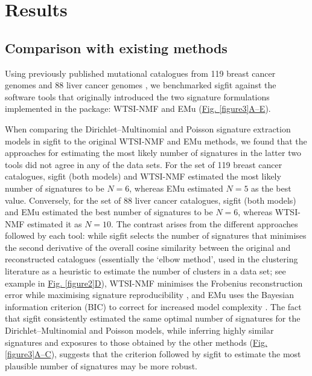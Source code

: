 \section*{Results}
\subsection*{Comparison with existing methods}
Using previously published mutational catalogues from 119 breast cancer genomes and 88 liver cancer genomes \cite{Alexandrov2013}, we benchmarked sigfit against the software tools that originally introduced the two signature formulations implemented in the package: WTSI-NMF \cite{AlexandrovCellRep2013} and EMu \cite{Fischer2013} (\hyperref[figure3]{Fig. \ref*{figure3}A--E}).

When comparing the Dirichlet–Multinomial and Poisson signature extraction models in sigfit to the original WTSI-NMF and EMu methods, we found that the approaches for estimating the most likely number of signatures in the latter two tools did not agree in any of the data sets. For the set of 119 breast cancer catalogues, sigfit (both models) and WTSI-NMF estimated the most likely number of signatures to be $N=6$, whereas EMu estimated $N=5$ as the best value. Conversely, for the set of 88 liver cancer catalogues, sigfit (both models) and EMu estimated the best number of signatures to be $N=6$, whereas WTSI-NMF estimated it as $N=10$. The contrast arises from the different approaches followed by each tool: while sigfit selects the number of signatures that minimises the second derivative of the overall cosine similarity between the original and reconstructed catalogues (essentially the `elbow method', used in the clustering literature as a heuristic to estimate the number of clusters in a data set; see example in \hyperref[figure2]{Fig. \ref*{figure2}D}), WTSI-NMF minimises the Frobenius reconstruction error while maximising signature reproducibility \cite{AlexandrovCellRep2013}, and EMu uses the Bayesian information criterion (BIC) to correct for increased model complexity \cite{Fischer2013}. The fact that sigfit consistently estimated the same optimal number of signatures for the Dirichlet–Multinomial and Poisson models, while inferring highly similar signatures and exposures to those obtained by the other methods (\hyperref[figure3]{Fig. \ref*{figure3}A--C}), suggests that the criterion followed by sigfit to estimate the most plausible number of signatures may be more robust.

